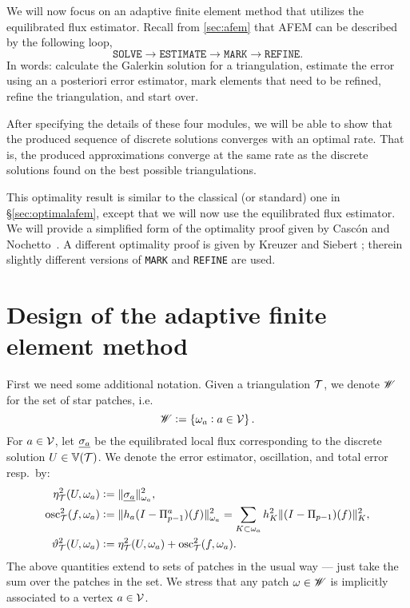 \documentclass[thesis.tex]{subfiles}
\begin{document}
We will now focus on an adaptive finite element method that utilizes the equilibrated flux estimator.
Recall from \ref{sec:afem} that AFEM can be described by the following loop,
\[
  \texttt{SOLVE} \to \texttt{ESTIMATE} \to \texttt{MARK} \to \texttt{REFINE}.
\]
In words: calculate the Galerkin solution for a triangulation, estimate
the error using an a posteriori error estimator, mark elements that need to be refined, refine
the triangulation, and start over. 

After specifying the details of these four modules, we will be able to show that the produced
sequence of discrete solutions converges with an optimal rate. That is,
the produced approximations converge at the same rate as the discrete solutions found on the best possible triangulations.

This optimality result
is similar to the classical (or standard) one in \S\ref{sec:optimalafem}, except that we will now use the equilibrated flux estimator.
We will provide a simplified form of the optimality proof given by Casc\'on and Nochetto~\cite{cascon2012}.
A different optimality proof is given by Kreuzer and Siebert \cite{kreuzersiebert}; therein
slightly different versions of \texttt{MARK} and \texttt{REFINE} are used.

\section{Design of the adaptive finite element method}
First we need some additional notation. Given a triangulation $\mathcal{T}$, we denote $\mathscr{W}$ for the set of star patches, i.e.~
\[
  \mathscr{W} := \set{\omega_a : a \in \mathcal{V}}.
\]
For $a \in \mathcal{V}$, let $\underline{\sigma_a}$ be the equilibrated local flux corresponding to the discrete solution $U \in \mathbb{V}(\mathcal{T})$. We denote the
  error estimator, oscillation, and total error resp.~by:
\begin{align*}
  \eta^2_{\mathcal{T}}(U, \omega_a) &:= \| \underline{\sigma_a} \|^2_{\omega_a}, \\
  \operatorname{osc}^2_{\mathcal{T}}(f, \omega_a) &:= \| h_a(I - \Pi_{p-1}^a)(f) \|_{\omega_a}^2 = \sum_{K \subset \omega_a} h_K^2 \| (I - \Pi_{p-1})(f) \|^2_K,\\
  \vartheta^2_{\mathcal{T}}(U, \omega_a) &:= \eta^2_{\mathcal{T}}(U, \omega_a) + \operatorname{osc}^2_{\mathcal{T}}(f, \omega_a).
\end{align*}
The above quantities extend to sets of patches in the usual way 
--- just take the sum over the patches in the set.
We stress that any patch $\omega \in \mathscr{W}$ is implicitly associated to a vertex $a \in \mathcal{V}$.
\end{document}
